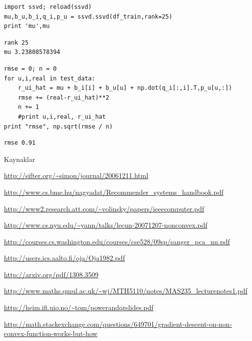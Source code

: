 \documentclass[12pt,fleqn]{article}\usepackage{../common}
\begin{document}
\begin{verbatim}
import ssvd; reload(ssvd)
mu,b_u,b_i,q_i,p_u = ssvd.ssvd(df_train,rank=25)
print 'mu',mu
\end{verbatim}

\begin{verbatim}
rank 25
mu 3.23808578394
\end{verbatim}


\begin{verbatim}
rmse = 0; n = 0
for u,i,real in test_data:
    r_ui_hat = mu + b_i[i] + b_u[u] + np.dot(q_i[:,i].T,p_u[u,:])
    rmse += (real-r_ui_hat)**2
    n += 1
    #print u,i,real, r_ui_hat
print "rmse", np.sqrt(rmse / n)
\end{verbatim}

\begin{verbatim}
rmse 0.91
\end{verbatim}










Kaynaklar

\url{http://sifter.org/~simon/journal/20061211.html}

\url{http://www.cs.bme.hu/nagyadat/Recommender_systems_handbook.pdf}

\url{http://www2.research.att.com/~volinsky/papers/ieeecomputer.pdf}

\url{http://www.cs.nyu.edu/~yann/talks/lecun-20071207-nonconvex.pdf}

\url{http://courses.cs.washington.edu/courses/cse528/09sp/sanger_pca_nn.pdf}

\url{http://users.ics.aalto.fi/oja/Oja1982.pdf}

\url{http://arxiv.org/pdf/1308.3509}

\url{http://www.maths.qmul.ac.uk/~wj/MTH5110/notes/MAS235_lecturenotes1.pdf}

\url{http://heim.ifi.uio.no/~tom/powerandqrslides.pdf}

\url{http://math.stackexchange.com/questions/649701/gradient-descent-on-non-convex-function-works-but-how}
\end{document}
